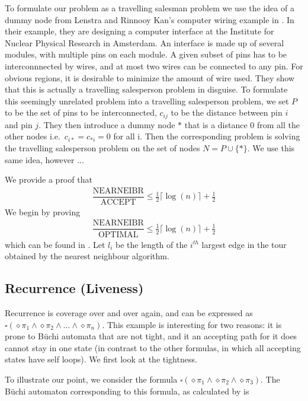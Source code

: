 To formulate our problem as a travelling salesman problem we use the idea of a dummy node from Lenstra and Rinnooy Kan's computer wiring example in \cite{lenstra75}. In their example, they are designing a computer interface at the Institute for Nuclear Physical Research in Amsterdam. An interface is made up of several modules, with multiple pins on each module. A given subset of pins has to be interconnnected by wires, and at most two wires can be connected to any pin. For obvious regions, it is desirable to minimize the amount of wire used. They show that this is actually a travelling salesperson problem in disguise. To formulate this seemingly unrelated problem into a travelling salesperson problem, we set $P$ to be the set of pins to be interconnected, $c_{ij}$ to be the distance between pin $i$ and pin $j$. They then introduce a dummy node $*$ that is a distance 0 from all the other nodes i.e.\ $c_{i*} = c_{*i} = 0$ for all i. Then the corresponding problem is solving the travelling salesperson problem on the set of nodes $N=P \cup \{*\}$. We use this same idea, however ...

We provide a proof that 
\begin{align*}
\dfrac{\text{NEARNEIBR}}{\text{ACCEPT}} \leq \frac{1}{2} \lceil \log(n) \rceil + \frac{1}{2}
\end{align*}
We begin by proving 
\begin{align*}
\dfrac{\text{NEARNEIBR}}{\text{OPTIMAL}} \leq \frac{1}{2} \lceil \log(n) \rceil + \frac{1}{2}
\end{align*}
which can be found in \cite{rosenkrantz74}. Let $l_i$ be the length of the $i^{th}$ largest edge in the tour obtained by the nearest neighbour algorithm. 


\subsection{Recurrence (Liveness)}
Recurrence is coverage over and over again, and can be expressed as $\square(\diamond \pi_1 \land \diamond \pi_2 \land \dots \land \diamond \pi_n)$. This example is interesting for two reasons: it is prone to B\"{u}chi automata that are not tight, and it an accepting path for it does cannot stay in one state (in contrast to the other formulas, in which all accepting states have self loops). We first look at the tightness.

To illustrate our point, we consider the formula $\square(\diamond \pi_1 \land \diamond \pi_2 \land \diamond \pi_3)$. The B\"{u}chi automaton corresponding to this formula, as calculated by \cite{gastin01} is 

